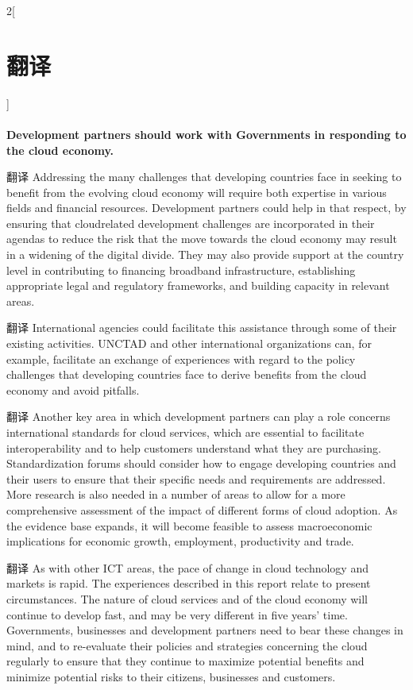 \documentclass[a4paper, UTF8, 12pt]{article}
\begin{document}
\begin{paracol}{2}[\section{翻译}]
\begin{itemize}
    \end{itemize}

    \switchcolumn*
    \paragraph{} 
    \switchcolumn
    {\bfseries Development partners should work with Governments in responding to the cloud economy.}

    \switchcolumn*
    翻译
    \switchcolumn
    Addressing the many challenges that developing countries face in seeking to benefit from the evolving cloud economy will require both expertise in various fields and financial resources. Development partners could help in that respect, by ensuring that cloudrelated development challenges are incorporated in their agendas to reduce the risk that the move towards the cloud economy may result in a widening of the digital divide. They may also provide support at the country level in contributing to financing broadband infrastructure, establishing appropriate legal and regulatory frameworks, and building capacity in relevant areas.

    \switchcolumn*
    翻译
    \switchcolumn
    International agencies could facilitate this assistance through some of their existing activities. UNCTAD and other international organizations can, for example, facilitate an exchange of experiences with regard to the policy challenges that developing countries face to derive benefits from the cloud economy and avoid pitfalls. 

    \switchcolumn*
    翻译
    \switchcolumn
    Another key area in which development partners can play a role concerns international standards for cloud services, which are essential to facilitate interoperability and to help customers understand what they are purchasing. Standardization forums should consider how to engage developing countries and their users to ensure that their specific needs and requirements are addressed. More research is also needed in a number of areas to allow for a more comprehensive assessment of the impact of different forms of cloud adoption. As the evidence base expands, it will become feasible to assess macroeconomic implications for economic growth, employment, productivity and trade. 

    \switchcolumn*
    翻译
    \switchcolumn
    As with other ICT areas, the pace of change in cloud technology and markets is rapid. The experiences described in this report relate to present circumstances. The nature of cloud services and of the cloud economy will continue to develop fast, and may be very different in five years’ time. Governments, businesses and development partners need to bear these changes in mind, and to re-evaluate their policies and strategies concerning the cloud regularly to ensure that they continue to maximize potential benefits and minimize potential risks to their citizens, businesses and customers.

\end{paracol}
\end{document}
